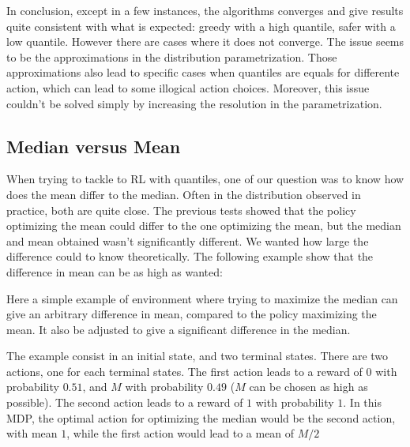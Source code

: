 In conclusion, except in a few instances, the algorithms converges and give results quite consistent with what is expected: greedy with a high quantile, safer with a low quantile. However there are cases where it does not converge. The issue seems to be the approximations in the distribution parametrization. Those approximations also lead to specific cases when quantiles are equals for differente action, which can lead to some illogical action choices. Moreover, this issue couldn’t be solved simply by increasing the resolution in the parametrization.

\subsection{Median versus Mean}

When trying to tackle to RL with quantiles, one of our question was to know how does the mean differ to the median. Often in the distribution observed in practice, both are quite close. The previous tests showed that the policy optimizing the mean could differ to the one optimizing the mean, but the median and mean obtained wasn’t significantly different. We wanted how large the difference could to know theoretically. The following example show that the difference in mean can be as high as wanted:

Here a simple example of environment where trying to maximize the median can give an arbitrary difference in mean, compared to the policy maximizing the mean. It also be adjusted to give a significant difference in the median.

\begin{center}
\end{center}

The example consist in an initial state, and two terminal states. There are two actions, one for each terminal states. The first action leads to a reward of $0$ with probability $0.51$, and $M$ with probability $0.49$ ($M$ can be chosen as high as possible). The second action leads to a reward of $1$ with probability $1$. In this MDP, the optimal action for optimizing the median would be the second action, with mean $1$, while the first action would lead to a mean of $M/2$

